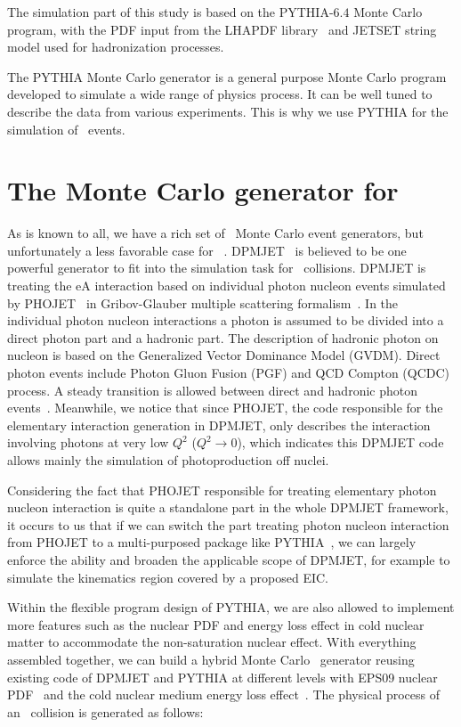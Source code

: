 The simulation part of this study is based on the PYTHIA-$6.4$ Monte Carlo program,
with the PDF input from the LHAPDF library~\cite{Whalley:2005nh} and JETSET string model used for
hadronization processes. 


The PYTHIA Monte Carlo generator is a general purpose Monte Carlo program developed to simulate a wide range of physics process. It can be well tuned to describe the data from various experiments. This is why we use PYTHIA for the simulation of \ep\ events.


\section{The Monte Carlo generator for \eA\ }

As is known to all, we have a rich set of \ep\ Monte Carlo event generators, but
unfortunately a less favorable case for \eA~\cite{Boer:2011fh}.
DPMJET~\cite{Roesler:2000he} is believed to be one powerful generator to fit
into the simulation task for \eA\ collisions. DPMJET is treating the eA
interaction based on individual photon nucleon events simulated by
PHOJET~\cite{Engel:1994vs} in Gribov-Glauber multiple scattering
formalism~\cite{Engel:1996yb}. In the individual photon nucleon interactions a
photon is assumed to be divided into a direct photon part and a hadronic part. The
description of hadronic photon on nucleon is based on the Generalized Vector
Dominance Model (GVDM). Direct photon events include Photon Gluon Fusion (PGF)
and QCD Compton (QCDC) process. A steady transition is allowed between direct
and hadronic photon events~\cite{Roesler:1998wy}. Meanwhile, we notice that
since PHOJET, the code responsible for the elementary interaction generation in
DPMJET, only describes the interaction involving photons at very low $Q^2$ ($Q^{2}\rightarrow 0$), which indicates 
this DPMJET code allows mainly the simulation of
photoproduction off nuclei.

Considering the fact that PHOJET responsible for treating elementary photon
nucleon interaction is quite a standalone part in the whole DPMJET framework, it
occurs to us that if we can switch the part treating photon nucleon interaction
from PHOJET to a multi-purposed package like
PYTHIA~\cite{Sjostrand:2006za}, we can largely enforce the ability and broaden
the applicable scope of DPMJET, for example to simulate the kinematics region
covered by a proposed EIC.

Within the flexible program design of PYTHIA, we are also allowed to implement
more features such as the nuclear PDF and energy loss effect in cold nuclear
matter to accommodate the non-saturation nuclear effect. 
With everything assembled together, we can build a hybrid Monte Carlo \eA\ generator reusing existing
code of DPMJET and PYTHIA at different levels with EPS09 nuclear PDF~\cite{Eskola:2009uj}
and the cold nuclear medium energy loss effect~\cite{Salgado:2003gb}. The physical process of an \eA\ collision is
generated as follows:

